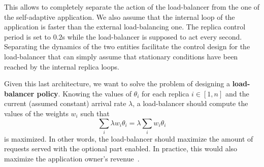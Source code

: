 This allows to completely separate the action of the load-balancer
from the one of the self-adaptive application. We also assume that the
internal loop of the application is faster than the external
load-balancing one. The replica control period is set to $0.2$s while
the load-balancer is supposed to act every second. Separating the
dynamics of the two entities facilitate the control design for the
load-balancer that can simply assume that stationary conditions have
been reached by the internal replica loops.

Given this last architecture, we want to solve the problem of designing a
{\bf load-balancer policy}. Knowing the values of $\theta_i$ for each
replica $i \in [1, n]$ and the current (assumed constant) arrival rate
$\lambda$, a load-balancer should compute the values of the weights
$w_i$ such that
\begin{equation}
\sum_{i} \lambda w_i \theta_i = \lambda \sum_i w_i \theta_i
\label{eq:objective}
\end{equation}
is maximized. In other words, the load-balancer should maximize the
amount of requests served with the optional part enabled. In practice,
this would also maximize the application owner's
revenue~\cite{cloudish-tr}.
